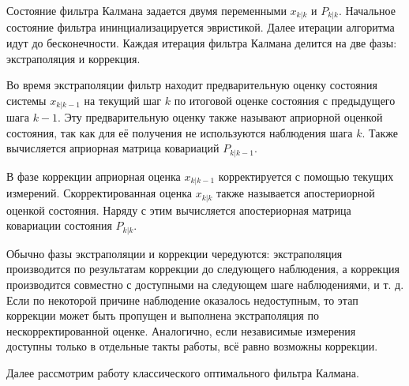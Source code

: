 \documentclass[12pt]{article}
\begin{document}
Состояние фильтра Калмана задается двумя переменными $x_{k|k}$ и $P_{k|k}$.
Начальное состояние фильтра ининциализацируется эвристикой. Далее итерации
алгоритма идут до бесконечности. Каждая итерация фильтра Калмана делится на две фазы:
экстраполяция и коррекция.

Во время экстраполяции фильтр находит предварительную оценку состояния системы
$x_{k|k-1}$ на текущий шаг $k$ по итоговой оценке состояния с предыдущего
шага $k-1$. Эту предварительную оценку также называют априорной оценкой
состояния, так как для её получения не используются наблюдения шага $k$.
Также вычисляется априорная матрица ковариаций $P_{k|k-1}$.

В фазе коррекции априорная оценка $x_{k|k-1}$ корректируется с помощью текущих
измерений. Скорректированная оценка $x_{k|k}$ также называется апостериорной
оценкой состояния. Наряду с этим вычисляется апостериорная матрица ковариации
состояния $P_{k|k}$.

Обычно фазы экстраполяции и коррекции чередуются: экстраполяция производится
по результатам коррекции до следующего наблюдения, а коррекция производится
совместно с доступными на следующем шаге наблюдениями, и т. д. Если по некоторой
причине наблюдение оказалось недоступным, то этап коррекции
может быть пропущен и выполнена экстраполяция по нескорректированной оценке.
Аналогично, если независимые измерения доступны только в отдельные такты работы,
всё равно возможны коррекции.

Далее рассмотрим работу классического оптимального фильтра Калмана.
\end{document}
